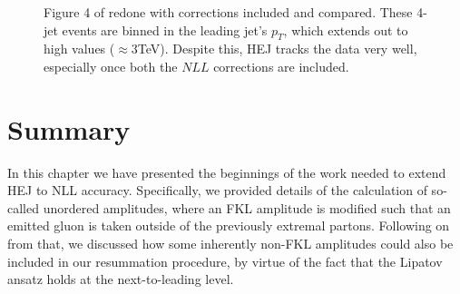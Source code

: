 \begin{figure}[H]
\caption{Figure 4 of \cite{Aad2015} redone with corrections included and compared. These 4-jet events are binned in the leading jet's $p_T$, which extends out to high values ($\approx 3$TeV). Despite this, HEJ tracks the data very well, especially once both the $NLL$ corrections are included.}
\label{fig:4jet}
\end{figure}


\section{Summary}
In this chapter we have presented the beginnings of the work needed to extend HEJ to NLL accuracy. Specifically, we provided details of the calculation of so-called unordered amplitudes, where an FKL amplitude is modified such that an emitted gluon is taken outside of the previously extremal partons. Following on from that, we discussed how some inherently non-FKL amplitudes could also be included in our resummation procedure, by virtue of the fact that the Lipatov ansatz holds at the next-to-leading level.

